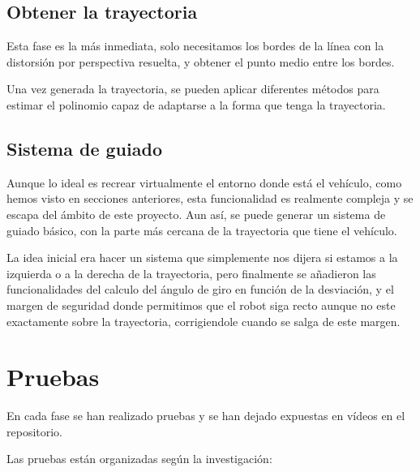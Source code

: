 \subsection{Obtener la trayectoria}
Esta fase es la más inmediata, solo necesitamos los bordes de la línea con la distorsión por perspectiva resuelta, y obtener el punto medio entre los bordes.

Una vez generada la trayectoria, se pueden aplicar diferentes métodos para estimar el polinomio capaz de adaptarse a la forma que tenga la trayectoria.


\subsection{Sistema de guiado}
Aunque lo ideal es recrear virtualmente el entorno donde está el vehículo, como hemos visto en secciones anteriores, esta funcionalidad es realmente compleja y se escapa del ámbito de este proyecto. Aun así, se puede generar un sistema de guiado básico, con la parte más cercana de la trayectoria que tiene el vehículo. 

La idea inicial era hacer un sistema que simplemente nos dijera si estamos a la izquierda o a la derecha de la trayectoria, pero finalmente se añadieron las funcionalidades del calculo del ángulo de giro en función de la desviación, y el margen de seguridad donde permitimos que el robot siga recto aunque no este exactamente sobre la trayectoria, corrigiendole cuando se salga de este margen.

\section{Pruebas}
En cada fase se han realizado pruebas y se han dejado expuestas en vídeos en el repositorio.

Las pruebas están organizadas según la investigación:

